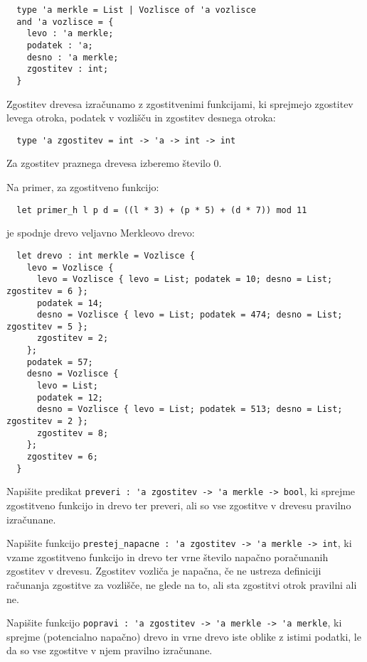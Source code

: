 \documentclass[arhiv]{../izpit}
\begin{document}
\begin{verbatim}
  type 'a merkle = List | Vozlisce of 'a vozlisce
  and 'a vozlisce = {
    levo : 'a merkle;
    podatek : 'a;
    desno : 'a merkle;
    zgostitev : int;
  }
\end{verbatim}

Zgostitev drevesa izračunamo z zgostitvenimi funkcijami, ki sprejmejo zgostitev levega otroka, podatek v vozlišču in zgostitev desnega otroka:
\begin{verbatim}
  type 'a zgostitev = int -> 'a -> int -> int
\end{verbatim}
Za zgostitev praznega drevesa izberemo število 0.

Na primer, za zgostitveno funkcijo:
\begin{verbatim}
  let primer_h l p d = ((l * 3) + (p * 5) + (d * 7)) mod 11
\end{verbatim}
je spodnje drevo veljavno Merkleovo drevo:
\begin{verbatim}
  let drevo : int merkle = Vozlisce {
    levo = Vozlisce {
      levo = Vozlisce { levo = List; podatek = 10; desno = List; zgostitev = 6 };
      podatek = 14;
      desno = Vozlisce { levo = List; podatek = 474; desno = List; zgostitev = 5 };
      zgostitev = 2;
    };
    podatek = 57;
    desno = Vozlisce {
      levo = List;
      podatek = 12;
      desno = Vozlisce { levo = List; podatek = 513; desno = List; zgostitev = 2 };
      zgostitev = 8;
    };
    zgostitev = 6;
  }
\end{verbatim}

\podnaloga
  Napišite predikat \verb|preveri : 'a zgostitev -> 'a merkle -> bool|, ki sprejme zgostitveno funkcijo in drevo ter preveri, ali so vse zgostitve v drevesu pravilno izračunane.

\podnaloga
  Napišite funkcijo \verb|prestej_napacne : 'a zgostitev -> 'a merkle -> int|, ki vzame zgostitveno funkcijo in drevo ter vrne število napačno poračunanih zgostitev v drevesu. Zgostitev vozliča je napačna, če ne ustreza definiciji računanja zgostitve za vozlišče, ne glede na to, ali sta zgostitvi otrok pravilni ali ne.

\podnaloga
  Napišite funkcijo \verb|popravi : 'a zgostitev -> 'a merkle -> 'a merkle|, ki sprejme (potencialno napačno) drevo in vrne drevo iste oblike z istimi podatki, le da so vse zgostitve v njem pravilno izračunane.


\naloga
\end{document}
